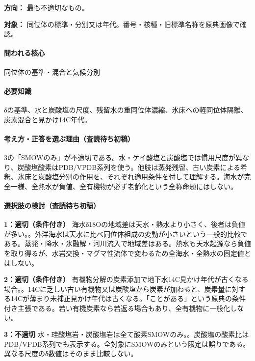 \noindent\textbf{方向：} 最も不適切なもの。\par

\noindent\textbf{対象：} 同位体の標準・分別又は年代。番号・核種・旧標準名称を原典画像で確認。\par

\paragraph{問われる核心} 同位体の基準・混合と気候分別

\paragraph{必要知識} δの基準、水と炭酸塩の尺度、残留水の重同位体濃縮、氷床への軽同位体隔離、炭素混合と見かけ14C年代。

\paragraph{考え方・正答を選ぶ理由（査読待ち初稿）} 3の「SMOWのみ」が不適切である。水・ケイ酸塩と炭酸塩では慣用尺度が異なり、炭酸塩酸素はPDB/VPDB系列を使う。他肢は蒸発残留、古い炭素による希釈、氷床と炭酸塩分別の作用を、それぞれ適用条件を付して理解する。海水が完全一様、全熱水が負値、全有機物が必ず老齢化という全称命題にはしない。

\paragraph{選択肢の検討（査読待ち初稿）}\mbox{}\par

\noindent\textbf{1：適切（条件付き）} 海水δ18Oの地域差は天水・熱水より小さく、後者は負値が多い。。外洋海水は天水に比べ同位体組成の変動が小さいという一般的比較である。蒸発・降水・氷融解・河川流入で地域差はある。熱水も天水起源なら負値を取り得るが、水岩交換・マグマ性流体で変わるため全海水・全熱水の固定値とはしない。\par

\noindent\textbf{2：適切（条件付き）} 有機物分解の炭素添加で地下水14C見かけ年代が古くなる場合。。14Cに乏しい古い有機物又は炭酸塩から炭素が加わると、炭素量に対する14Cが薄まり未補正見かけ年代は古くなる。「ことがある」という原典の条件付き主張である。若い有機炭素なら若返る場合もあり、全有機物に一般化しない。\par

\noindent\textbf{3：不適切} 水・珪酸塩岩・炭酸塩岩は全て酸素SMOWのみ。。炭酸塩の酸素比はPDB/VPDB系列でも表示する。全対象にSMOWのみという限定は誤りである。異なる尺度のδ数値はそのまま比較しない。\par

